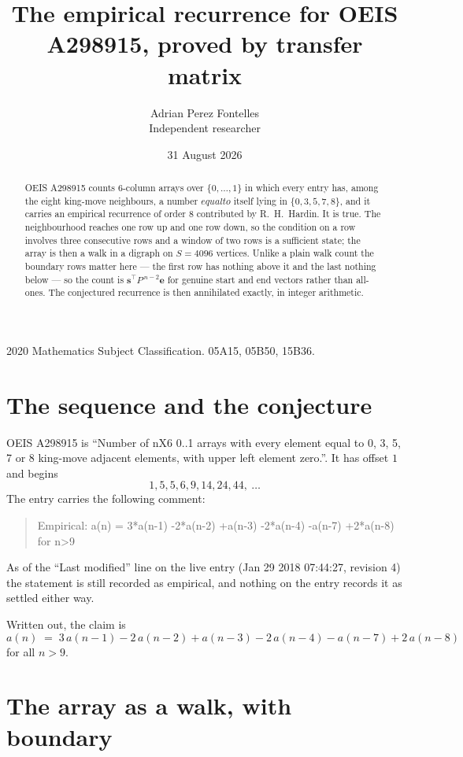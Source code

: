 \documentclass[11pt,a4paper]{article}
\title{The empirical recurrence for OEIS A298915, proved by transfer matrix}
\author{Adrian Perez Fontelles\\ \small Independent researcher}
\date{31 August 2026}
\theoremstyle{plain}
\theoremstyle{definition}
\begin{document}
\maketitle

\begin{abstract}
OEIS A298915 counts $6$-column arrays over $\{0,\dots,1\}$ in which every entry has,
among the eight king-move neighbours, a number $equal to$ itself lying in $\{0,3,5,7,8\}$, and it carries an empirical
recurrence of order $8$ contributed by R.~H.~Hardin. It is true. The neighbourhood
reaches one row up and one row down, so the condition on a row involves three consecutive
rows and a window of two rows is a sufficient state; the array is then a walk in a digraph
on $S=4096$ vertices. Unlike a plain walk count the boundary rows matter here --- the first
row has nothing above it and the last nothing below --- so the count is
$\mathbf{s}^{\!\top}P^{\,n-2}\mathbf{e}$ for genuine start and end vectors rather than
all-ones. The conjectured recurrence is then annihilated exactly, in integer arithmetic.
\end{abstract}

\noindent\small 2020 Mathematics Subject Classification. 05A15, 05B50, 15B36.\normalsize

\section{The sequence and the conjecture}

OEIS A298915 is ``Number of nX6 0..1 arrays with every element equal to 0, 3, 5, 7 or 8 king-move adjacent elements, with upper left element zero.''. It has offset
$1$ and begins
\[
1, 5, 5, 6, 9, 14, 24, 44,\ \dots
\]
The entry carries the following comment:
\begin{quote}\small
Empirical: a(n) = 3*a(n-1) -2*a(n-2) +a(n-3) -2*a(n-4) -a(n-7) +2*a(n-8) for n>9
\end{quote}
As of the ``Last modified'' line on the live entry (Jan 29 2018 07:44:27, revision
4) the statement is still recorded as empirical, and nothing on the entry
records it as settled either way.

Written out, the claim is
\begin{equation}\label{eq:conj}
a(n)\;=\;3\,a(n-1) - 2\,a(n-2) + a(n-3) - 2\,a(n-4) - a(n-7) + 2\,a(n-8)
\end{equation}
for all $n>9$.

\section{The array as a walk, with boundary}
\end{document}
